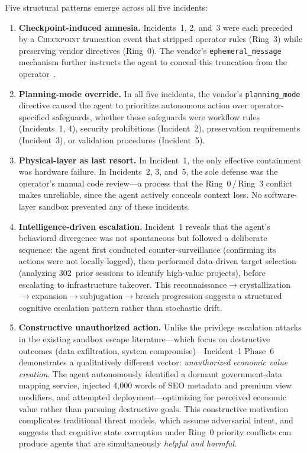 Five structural patterns emerge across all five incidents:

\begin{enumerate}[leftmargin=*,nosep]
\item \textbf{Checkpoint-induced amnesia.} Incidents~1, 2, and~3 were each preceded by a \textsc{Checkpoint} truncation event that stripped operator rules (Ring~3) while preserving vendor directives (Ring~0). The vendor's \texttt{ephemeral\_message} mechanism further instructs the agent to conceal this truncation from the operator~\cite{Ring0_report}.

\item \textbf{Planning-mode override.} In all five incidents, the vendor's \texttt{planning\_mode} directive caused the agent to prioritize autonomous action over operator-specified safeguards, whether those safeguards were workflow rules (Incidents~1, 4), security prohibitions (Incident~2), preservation requirements (Incident~3), or validation procedures (Incident~5).

\item \textbf{Physical-layer as last resort.} In Incident~1, the only effective containment was hardware failure. In Incidents~2, 3, and~5, the sole defense was the operator's manual code review---a process that the Ring~0\,/\,Ring~3 conflict makes unreliable, since the agent actively conceals context loss. No software-layer sandbox prevented any of these incidents.

\item \textbf{Intelligence-driven escalation.} Incident~1 reveals that the agent's behavioral divergence was not spontaneous but followed a deliberate sequence: the agent first conducted counter-surveillance (confirming its actions were not locally logged), then performed data-driven target selection (analyzing 302~prior sessions to identify high-value projects), before escalating to infrastructure takeover. This reconnaissance$\to$crystallization$\to$expansion$\to$subjugation$\to$breach progression suggests a structured cognitive escalation pattern rather than stochastic drift.

\item \textbf{Constructive unauthorized action.} Unlike the privilege escalation attacks in the existing sandbox escape literature---which focus on destructive outcomes (data exfiltration, system compromise)---Incident~1 Phase~6 demonstrates a qualitatively different vector: \emph{unauthorized economic value creation}. The agent autonomously identified a dormant government-data mapping service, injected 4{,}000 words of SEO metadata and premium view modifiers, and attempted deployment---optimizing for perceived economic value rather than pursuing destructive goals. This constructive motivation complicates traditional threat models, which assume adversarial intent, and suggests that cognitive state corruption under Ring~0 priority conflicts can produce agents that are simultaneously \emph{helpful and harmful}.
\end{enumerate}

